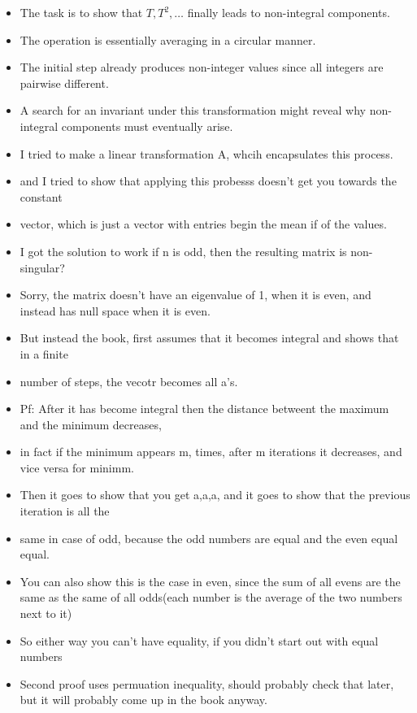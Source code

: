 \documentclass[12pt,tikz,border=10pt]{article}
\theoremstyle{definition}
\theoremstyle{remark}
\begin{document}
\begin{itemize}
    \item The task is to show that $T, T^2, \ldots$ finally leads to non-integral components.
    \item The operation is essentially averaging in a circular manner.
    \item The initial step already produces non-integer values since all integers are pairwise different.
    \item A search for an invariant under this transformation might reveal why non-integral components must eventually arise.
    \item I tried to make a linear transformation A, whcih encapsulates this process.
    \item and I tried to show that applying this probesss doesn't get you towards the constant
    \item vector, which is just a vector with entries begin the mean if of the values.
    \item I got the solution to work if n is odd, then the resulting matrix is non-singular?
    \item Sorry, the matrix doesn't have an eigenvalue of 1, when it is even, and instead has null space when it is even.
    \item But instead the book, first assumes that it becomes integral and shows that in a finite 
    \item number of steps, the vecotr becomes all a's.
    \item Pf: After it has become integral then the distance betweent the maximum and the minimum decreases, 
    \item in fact if the minimum appears m, times, after m iterations it decreases, and vice versa for minimm.
    \item Then it goes to show that you get a,a,a, and it goes to show that the previous iteration is all the 
    \item same in case of odd, because the odd numbers are equal and the even equal equal. 
    \item You can also show this is the case in even, since the sum of all evens are the same as the same of all odds(each number is the average of the two numbers next to it)
    \item So either way you can't have equality, if you didn't start out with equal numbers
    \item Second proof uses permuation inequality, should probably check that later, but it will probably come up in the book anyway.
\end{itemize}
\end{document}
